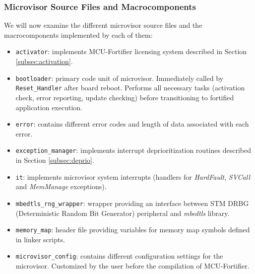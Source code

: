 \documentclass{article}
\begin{document}
\subsubsection{Microvisor Source Files and Macrocomponents}
We will now examine the different microvisor source files and the macrocomponents implemented by each of them:
\begin{itemize}
	\item \verb|activator|: implements MCU-Fortifier licensing system described in Section \ref{subsec:activation}.
	\item \verb|bootloader|: primary code unit of microvisor. Immediately called by \verb|Reset_Handler| after board reboot. Performs all necessary tasks (activation check, error reporting, update checking) before transitioning to fortified application execution.
	\item \verb|error|: contains different error codes and length of data associated with each error.
	\item \verb|exception_manager|: implements interrupt deprioritization routines described in Section \ref{subsec:deprio}.
	\item \verb|it|: implements microvisor system interrupts (handlers for \textit{HardFault}, \textit{SVCall} and \textit{MemManage} exceptions).
	\item \verb|mbedtls_rng_wrapper|: wrapper providing an interface between STM DRBG (Deterministic Random Bit Generator) peripheral and \textit{mbedtls} library.
	\item \verb|memory_map|: header file providing variables for memory map symbols defined in linker scripts.
	\item \verb|microvisor_config|: contains different configuration settings for the microvisor. Customized by the user before the compilation of MCU-Fortifier.
	

\end{itemize}
\end{document}

